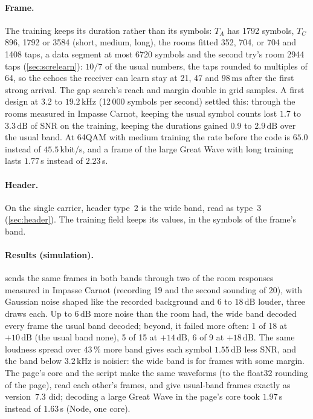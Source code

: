 \documentclass[11pt,a4paper]{article}
\newcommand{\kHz}{\,\mathrm{kHz}}
\newcommand{\ms}{\,\mathrm{ms}}
\newcommand{\dB}{\,\mathrm{dB}}
\theoremstyle{remark}
\begin{document}
\paragraph{Frame.}
The training keeps its duration rather than its symbols: $T_A$ has 1792 symbols, $T_C$ 896, 1792 or 3584 (short, medium, long), the rooms fitted 352, 704, or 704 and 1408 taps, a data segment at most 6720 symbols and the second try's room 2944 taps (\cref{sec:screlearn}): $10/7$ of the usual numbers, the taps rounded to multiples of 64, so the echoes the receiver can learn stay at 21, 47 and $98\ms$ after the first strong arrival. The gap search's reach and margin double in grid samples. A first design at $3.2$ to $19.2\kHz$ (12\,000 symbols per second) settled this: through the rooms measured in Impasse Carnot, keeping the usual symbol counts lost $1.7$ to $3.3\dB$ of SNR on the training, keeping the durations gained $0.9$ to $2.9\dB$ over the usual band. At 64QAM with medium training the rate before the code is $65.0$ instead of $45.5$\,kbit/s, and a frame of the large Great Wave with long training lasts $1.77$\,s instead of $2.23$\,s.

\paragraph{Header.}
On the single carrier, header type~2 is the wide band, read as type~3 (\cref{sec:header}). The training field keeps its values, in the symbols of the frame's band.

\paragraph{Results (simulation).}
 sends the same frames in both bands through two of the room responses measured in Impasse Carnot (recording 19 and the second sounding of 20), with Gaussian noise shaped like the recorded background and 6 to $18\dB$ louder, three draws each. Up to $6\dB$ more noise than the room had, the wide band decoded every frame the usual band decoded; beyond, it failed more often: 1 of 18 at $+10\dB$ (the usual band none), 5 of 15 at $+14\dB$, 6 of 9 at $+18\dB$. The same loudness spread over $43\,\%$ more band gives each symbol $1.55\dB$ less SNR, and the band below $3.2\kHz$ is noisier: the wide band is for frames with some margin. The page's core and the script make the same waveforms (to the float32 rounding of the page), read each other's frames, and give usual-band frames exactly as version~7.3 did; decoding a large Great Wave in the page's core took $1.97$\,s instead of $1.63$\,s (Node, one core).
\end{document}
